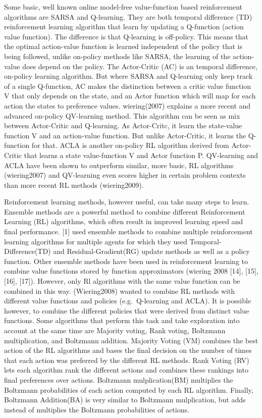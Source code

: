 Some basic, well known online model-free value-function based
reinforcement algorithms are SARSA and Q-learning. They are both
temporal difference (TD) reinforcement learning algorithm that learn by
updating a Q-function (action value function). The difference is that
Q-learning is off-policy. This means that the optimal action-value
function is learned independent of the policy that is being followed,
unlike on-policy methods like SARSA, the learning of the action-value
does depend on the policy. The Actor-Critic (AC) is an temporal
difference, on-policy learning algorithm. But where SARSA and Q-learning
only keep track of a single Q-function, AC makes the distinction between
a critic value function V that only depends on the state, and an Actor
function which will map for each action the states to preference values.
wiering(2007) explains a more recent and advanced on-policy QV-learning
method. This algorithm can be seen as mix between Actor-Critic and
Q-learning. As Actor-Critc, it learn the state-value function V and an
action-value function. But unlike Actor-Critic, it learns the Q-function
for that. ACLA is another on-policy RL algorithm derived from
Actor-Critic that learns a state value-function V and Actor function P.
QV-learning and ACLA have been shown to outperform similar, more basic,
RL algorithms (wiering2007) and QV-learning even scores higher in
certain problem contexts than more recent RL methods (wiering2009).

Reinforcement learning methods, however useful, can take many steps to
learn. Ensemble methods are a powerful method to combine different
Reinforcement Learning (RL) algorithms, which often result in improved
learning speed and final performance. {[}1{]} used ensemble methods to
combine multiple reinforcement learning algorithms for multiple agents
for which they used Temporal-Difference(TD) and Residual-Gradient(RG)
update methods as well as a policy function. Other ensemble methods have
been used in reinforcement learning to combine value functions stored by
function approximators (wiering 2008 {[}14{]}, {[}15{]}, {[}16{]},
{[}17{]}). However, only Rl algorithms with the same value function can
be combined in this way. (Wiering2008) wanted to combine RL methods with
different value functions and policies (e.g.~Q-learning and ACLA). It is
possible however, to combine the different policies that were derived
from distinct value functions. Some algorithms that perform this task
and take exploration into account at the same time are Majority voting,
Rank voting, Boltzmann multiplication, and Boltzmann addition. Majority
Voting (VM) combines the best action of the RL algorithms and bases the
final decision on the number of times that each action was preferred by
the different RL methods. Rank Voting (RV) lets each algorithm rank the
different actions and combines these rankings into ﬁnal preferences over
actions. Boltzmann mulplication(BM) multiplies the Boltzmann
probabilities of each action computed by each RL algorithm. Finally,
Boltzmann Addition(BA) is very similar to Boltzmann mulplication, but
adds instead of multiplies the Boltzmann probabilities of actions.

